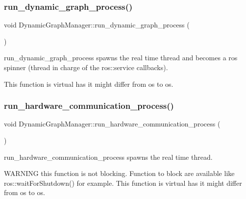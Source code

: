 \subsubsection{\texorpdfstring{run\+\_\+dynamic\+\_\+graph\+\_\+process()}{run\_dynamic\_graph\_process()}}
{\footnotesize\ttfamily void Dynamic\+Graph\+Manager\+::run\+\_\+dynamic\+\_\+graph\+\_\+process (\begin{DoxyParamCaption}{ }\end{DoxyParamCaption})\hspace{0.3cm}{\ttfamily [virtual]}}



run\+\_\+dynamic\+\_\+graph\+\_\+process spawns the real time thread and becomes a ros spinner (thread in charge of the ros\+::service callbacks). 

This function is virtual has it might differ from os to os. \mbox{\label{classdynamic__graph_1_1DynamicGraphManager_a81e7cb10262383030c10156730d39ce8}} 
\subsubsection{\texorpdfstring{run\+\_\+hardware\+\_\+communication\+\_\+process()}{run\_hardware\_communication\_process()}}
{\footnotesize\ttfamily void Dynamic\+Graph\+Manager\+::run\+\_\+hardware\+\_\+communication\+\_\+process (\begin{DoxyParamCaption}{ }\end{DoxyParamCaption})\hspace{0.3cm}{\ttfamily [virtual]}}



run\+\_\+hardware\+\_\+communication\+\_\+process spawns the real time thread. 

W\+A\+R\+N\+I\+NG this function is not blocking. Function to block are available like ros\+::wait\+For\+Shutdown() for example. This function is virtual has it might differ from os to os. \mbox{\label{classdynamic__graph_1_1DynamicGraphManager_a56acce72235fe0786830ec19a3439309}} 
